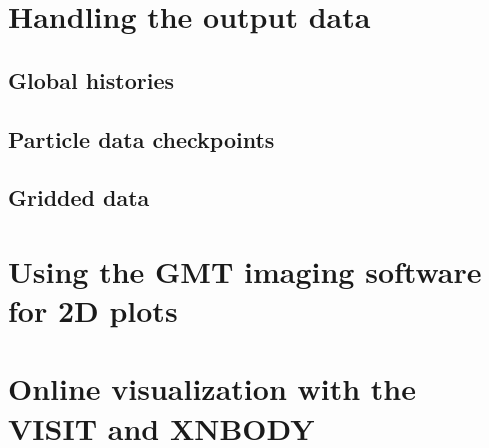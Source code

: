 \documentclass[12pt,psfig]{article}
\begin{document}
\section{Handling the output data \label{output}}

\subsection{Global histories}

\subsection{Particle data checkpoints}

\subsection{Gridded data}

\section{Using the GMT imaging software for 2D plots}

\section{Online visualization with the VISIT and XNBODY}
\end{document}
